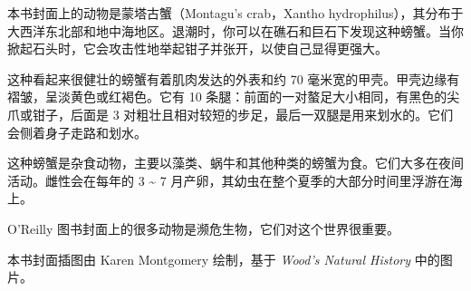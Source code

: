 
本书封面上的动物是蒙塔古蟹（Montagu's crab，Xantho hydrophilus），其分布于大西洋东北部和地中海地区。退潮时，你可以在礁石和巨石下发现这种螃蟹。当你掀起石头时，它会攻击性地举起钳子并张开，以使自己显得更强大。

这种看起来很健壮的螃蟹有着肌肉发达的外表和约 70 毫米宽的甲壳。甲壳边缘有褶皱，呈淡黄色或红褐色。它有 10 条腿：前面的一对螯足大小相同，有黑色的尖爪或钳子，后面是 3 对粗壮且相对较短的步足，最后一双腿是用来划水的。它们会侧着身子走路和划水。

这种螃蟹是杂食动物，主要以藻类、蜗牛和其他种类的螃蟹为食。它们大多在夜间活动。雌性会在每年的 3 \textasciitilde{} 7 月产卵，其幼虫在整个夏季的大部分时间里浮游在海上。

O'Reilly 图书封面上的很多动物是濒危生物，它们对这个世界很重要。

本书封面插图由 Karen Montgomery 绘制，基于 \emph{Wood's Natural History} 中的图片。


